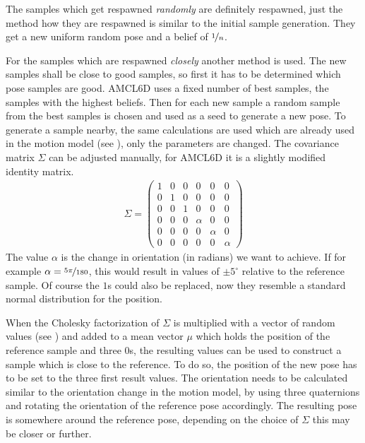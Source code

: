 \documentclass[Thesis.tex]{subfiles}
\begin{document}
The samples which get respawned \emph{randomly} are definitely respawned, just the method how they are respawned is similar to the initial sample generation. They get a new uniform random pose and a belief of $\nicefrac{1}{n}$.

For the samples which are respawned \emph{closely} another method is used. The new samples shall be close to good samples, so first it has to be determined which pose samples are good. \gls{AMCL6D} uses a fixed number of best samples, the samples with the highest beliefs. Then for each new sample a random sample from the best samples is chosen and used as a seed to generate a new pose. To generate a sample nearby, the same calculations are used which are already used in the motion model (see ), only the parameters are changed. The covariance matrix $\Sigma$ can be adjusted manually, for \gls{AMCL6D} it is a slightly modified identity matrix.
\begin{align}
\Sigma = \left(\begin{array}{cccccc}
1 & 0 & 0 & 0 & 0 & 0 \\
0 & 1 & 0 & 0 & 0 & 0 \\
0 & 0 & 1 & 0 & 0 & 0 \\
0 & 0 & 0 & \alpha & 0 & 0 \\
0 & 0 & 0 & 0 & \alpha & 0 \\
0 & 0 & 0 & 0 & 0 & \alpha
\end{array}\right)
\end{align}
The value $\alpha$ is the change in orientation (in radians) we want to achieve. If for example $\alpha = \nicefrac{5\pi}{180}$, this would result in values of $\pm 5^\circ$ relative to the reference sample. Of course the $1$s could also be replaced, now they resemble a standard normal distribution for the position.

When the Cholesky factorization of $\Sigma$ is multiplied with a vector of random values (see ) and added to a mean vector $\mu$ which holds the position of the reference sample and three $0$s, the resulting values can be used to construct a sample which is close to the reference. To do so, the position of the new pose has to be set to the three first result values. The orientation needs to be calculated similar to the orientation change in the motion model, by using three quaternions and rotating the orientation of the reference pose accordingly. The resulting pose is somewhere around the reference pose, depending on the choice of $\Sigma$ this may be closer or further.
\end{document}

